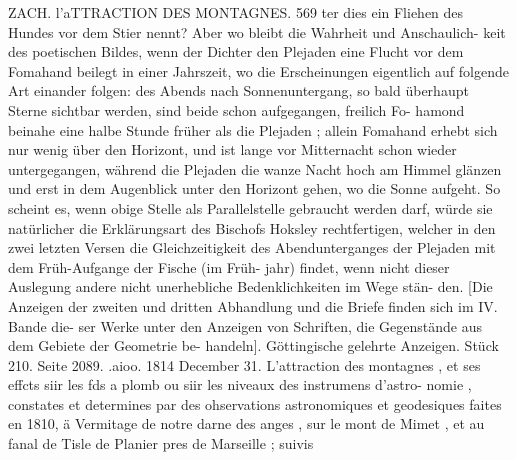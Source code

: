 \documentclass[12pt,a4paper]{article}
\begin{document}
\newpage
ZACH. l'aTTRACTION DES MONTAGNES. 569\newline
ter dies ein Fliehen des Hundes vor dem Stier nennt? Aber wo bleibt die Wahrheit und Anschaulich-\newline
keit des poetischen Bildes, wenn der Dichter den Plejaden eine Flucht vor dem Fomahand beilegt in\newline
einer Jahrszeit, wo die Erscheinungen eigentlich auf folgende Art einander folgen: des Abends nach\newline
Sonnenuntergang, so bald überhaupt Sterne sichtbar werden, sind beide schon aufgegangen, freilich Fo-\newline
hamond beinahe eine halbe Stunde früher als die Plejaden ; allein Fomahand erhebt sich nur wenig über\newline
den Horizont, und ist lange vor Mitternacht schon wieder untergegangen, während die Plejaden die\newline
wanze Nacht hoch am Himmel glänzen und erst in dem Augenblick unter den Horizont gehen, wo die\newline
Sonne aufgeht. So scheint es, wenn obige Stelle als Parallelstelle gebraucht werden darf, würde sie\newline
natürlicher die Erklärungsart des Bischofs Hoksley rechtfertigen, welcher in den zwei letzten Versen\newline
die Gleichzeitigkeit des Abendunterganges der Plejaden mit dem Früh-Aufgange der Fische (im Früh-\newline
jahr) findet, wenn nicht dieser Auslegung andere nicht unerhebliche Bedenklichkeiten im Wege stän-\newline
den. [Die Anzeigen der zweiten und dritten Abhandlung und die Briefe finden sich im IV. Bande die-\newline
ser Werke unter den Anzeigen von Schriften, die Gegenstände aus dem Gebiete der Geometrie be-\newline
handeln].\newline
Göttingische gelehrte Anzeigen. Stück 210. Seite 2089. .aioo. 1814 December 31.\newline
L'attraction des montagnes , et ses effcts siir les fds a plomb ou siir les niveaux des instrumens d'astro-\newline
nomie , constates et determines par des ohservations astronomiques et geodesiques faites en 1810, ä Vermitage\newline
de notre darne des anges , sur le mont de Mimet , et au fanal de Tisle de Planier pres de Marseille ; suivis\newline
\end{document}
